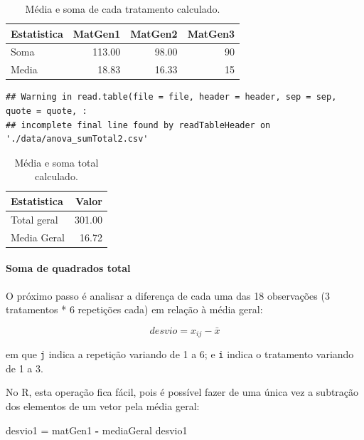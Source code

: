 \documentclass[
]{article}
\newenvironment{Shaded}{\begin{snugshade}}{\end{snugshade}}
\newcommand{\NormalTok}[1]{#1}
\newcommand{\OperatorTok}[1]{\textcolor[rgb]{0.81,0.36,0.00}{\textbf{#1}}}
\newcommand{\StringTok}[1]{\textcolor[rgb]{0.31,0.60,0.02}{#1}}
\begin{document}
\begin{table}

\caption{\label{tab:unnamed-chunk-13}Média e soma de cada tratamento calculado.}
\centering
\begin{tabular}[t]{l|r|r|r}
\hline
Estatistica & MatGen1 & MatGen2 & MatGen3\\
\hline
Soma & 113.00 & 98.00 & 90\\
\hline
Media & 18.83 & 16.33 & 15\\
\hline
\end{tabular}
\end{table}

\begin{verbatim}
## Warning in read.table(file = file, header = header, sep = sep, quote = quote, :
## incomplete final line found by readTableHeader on './data/anova_sumTotal2.csv'
\end{verbatim}

\begin{table}

\caption{\label{tab:unnamed-chunk-14}Média e soma total calculado.}
\centering
\begin{tabular}[t]{l|r}
\hline
Estatistica & Valor\\
\hline
Total geral & 301.00\\
\hline
Media Geral & 16.72\\
\hline
\end{tabular}
\end{table}

\hypertarget{soma-de-quadrados-total}{%
\paragraph{Soma de quadrados total}\label{soma-de-quadrados-total}}

O próximo passo é analisar a diferença de cada uma das 18 observações (3 tratamentos * 6 repetições cada) em relação à média geral:

\[desvio = x_{ij} - \bar{x}\]

em que \texttt{j} indica a repetição variando de 1 a 6; e \texttt{i} indica o tratamento variando de 1 a 3.

No R, esta operação fica fácil, pois é possível fazer de uma única vez a subtração dos elementos de um vetor pela média geral:

\begin{Shaded}
\begin{Highlighting}[]
\NormalTok{desvio1 =}\StringTok{ }\NormalTok{matGen1 }\OperatorTok{-}\StringTok{ }\NormalTok{mediaGeral}
\NormalTok{desvio1}
\end{Highlighting}
\end{Shaded}
\end{document}
